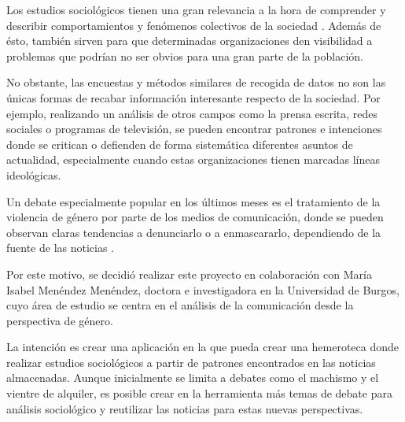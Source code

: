 
Los estudios sociológicos tienen una gran relevancia a la hora de comprender y describir comportamientos y fenómenos colectivos de la sociedad \cite{wiki:estudiosociologico}. Además de ésto, también sirven para que determinadas organizaciones den visibilidad a problemas que podrían no ser obvios para una gran parte de la población.

No obstante, las encuestas y métodos similares de recogida de datos no son las únicas formas de recabar información interesante respecto de la sociedad. Por ejemplo, realizando un análisis de otros campos como la prensa escrita, redes sociales o programas de televisión, se pueden encontrar patrones e intenciones donde se critican o defienden de forma sistemática diferentes asuntos de actualidad, especialmente cuando estas organizaciones tienen marcadas líneas ideológicas.

Un debate especialmente popular en los últimos meses es el tratamiento de la violencia de género por parte de los medios de comunicación, donde se pueden observan claras tendencias a denunciarlo o a enmascararlo, dependiendo de la fuente de las noticias \cite{RICD2653}.

Por este motivo, se decidió realizar este proyecto en colaboración con María Isabel Menéndez Menéndez, doctora e investigadora en la Universidad de Burgos, cuyo área de estudio se centra en el análisis de la comunicación desde la perspectiva de género. 

La intención es crear una aplicación en la que pueda crear una hemeroteca donde realizar estudios sociológicos a partir de patrones encontrados en las noticias almacenadas. Aunque inicialmente se limita a debates como el machismo y el vientre de alquiler, es posible crear en la herramienta más temas de debate para análisis sociológico y reutilizar las noticias para estas nuevas perspectivas.

